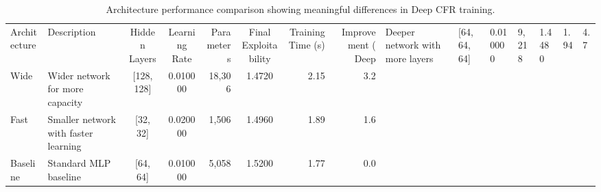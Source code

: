 \begin{table}
\caption{Architecture performance comparison showing meaningful differences in Deep CFR training.}
\label{tab:architecture_performance}
\begin{tabular}{l|l|c|c|r|c|r|r}
\toprule
Architecture & Description & Hidden Layers & Learning Rate & Parameters & Final Exploitability & Training Time (s) & Improvement (%
\midrule
Deep & Deeper network with more layers & [64, 64, 64] & 0.010000 & 9,218 & 1.4480 & 1.94 & 4.7 \\
Wide & Wider network for more capacity & [128, 128] & 0.010000 & 18,306 & 1.4720 & 2.15 & 3.2 \\
Fast & Smaller network with faster learning & [32, 32] & 0.020000 & 1,506 & 1.4960 & 1.89 & 1.6 \\
Baseline & Standard MLP baseline & [64, 64] & 0.010000 & 5,058 & 1.5200 & 1.77 & 0.0 \\
\bottomrule
\end{tabular}
\end{table}
